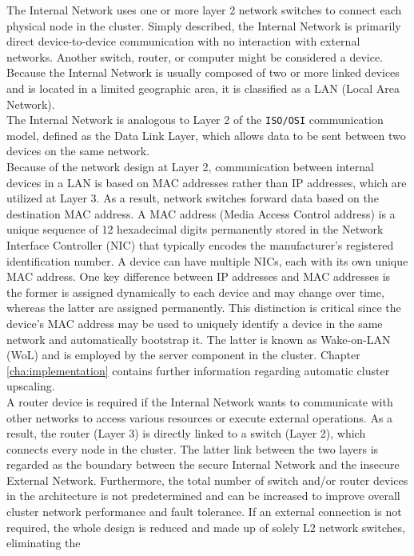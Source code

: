 The Internal Network uses one or more layer 2 network switches to connect each
physical node in the cluster. Simply described, the Internal Network is
primarily direct device-to-device communication with no interaction with
external networks. Another switch, router, or computer might be considered a device.
Because the Internal Network is usually composed of two or more linked devices
and is located in a limited geographic area, it is classified as a LAN (Local
Area Network). \\ %
The Internal Network is analogous to Layer 2 of the \texttt{ISO/OSI}
communication model, defined as the Data Link Layer, which allows data to be
sent between two devices on the same network. \\ %
Because of the network design at Layer 2, communication between internal devices
in a LAN is based on MAC addresses rather than IP addresses, which are utilized
at Layer 3. As a result, network switches forward data based on the destination MAC
address. A MAC address (Media Access Control address) is a unique sequence of 12
hexadecimal digits permanently stored in the Network Interface Controller (NIC)
that typically encodes the manufacturer's registered identification number. A device
can have multiple NICs, each with its own unique MAC address. One key difference
between IP addresses and MAC addresses is the former is assigned dynamically to each
device and may change over time, whereas the latter are assigned permanently. This
distinction is critical since the device's MAC address may be used to uniquely identify
a device in the same network and automatically bootstrap it. The latter is known
as Wake-on-LAN (WoL) and is employed by the server component in the cluster. Chapter
\ref{cha:implementation} contains further information regarding automatic cluster
upscaling. \\ %
A router device is required if the Internal Network wants to communicate with other
networks to access various resources or execute external operations. As a result,
the router (Layer 3) is directly linked to a switch (Layer 2), which connects
every node in the cluster. The latter link between the two layers is regarded as
the boundary between the secure Internal Network and the insecure External Network.
Furthermore, the total number of switch and/or router devices in the architecture
is not predetermined and can be increased to improve overall cluster network performance
and fault tolerance. If an external connection is not required, the whole design
is reduced and made up of solely L2 network switches, eliminating the
